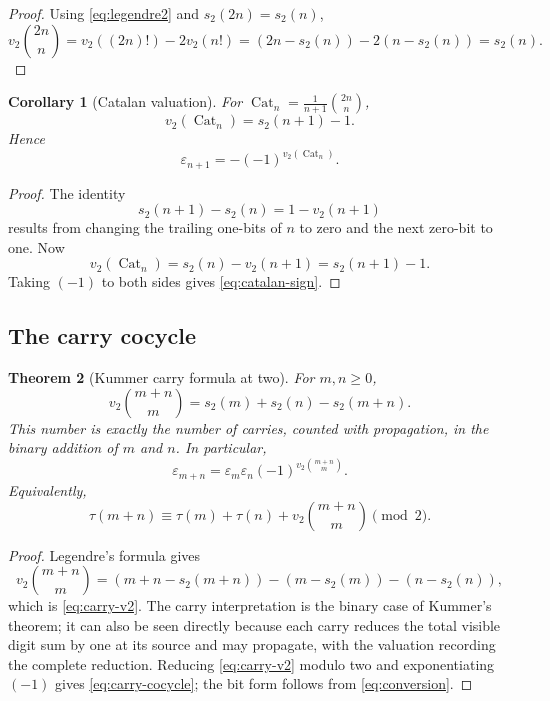 \documentclass[11pt,oneside]{article}
\newtheorem{theorem}{Theorem}[section]
\newtheorem{corollary}[theorem]{Corollary}
\theoremstyle{definition}
\theoremstyle{remark}
\newcommand{\swt}{s_2}
\newcommand{\vtwo}{v_2}
\newcommand{\eps}{\varepsilon}
\newcommand{\Cat}{\operatorname{Cat}}
\newcommand{\1}{\mathbf 1}
\begin{document}
\begin{proof}
Using \eqref{eq:legendre2} and \(\swt(2n)=\swt(n)\),
\[
 \vtwo\binom{2n}{n}
 =\vtwo((2n)!)-2\vtwo(n!)
 =(2n-\swt(n))-2(n-\swt(n))
 =\swt(n).
\]
\end{proof}

\begin{corollary}[Catalan valuation]
\label{cor:catalan}
For \(\Cat_n=\frac1{n+1}\binom{2n}{n}\),
\begin{equation}
 \vtwo(\Cat_n)=\swt(n+1)-1.
 \label{eq:catalan-v2}
\end{equation}
Hence
\begin{equation}
 \boxed{\eps_{n+1}=-(-1)^{\vtwo(\Cat_n)}}.
 \label{eq:catalan-sign}
\end{equation}
\end{corollary}

\begin{proof}
The identity
\begin{equation}
 \swt(n+1)-\swt(n)=1-\vtwo(n+1)
 \label{eq:successor-weight}
\end{equation}
results from changing the trailing one-bits of \(n\) to zero and the next zero-bit to one.
Now
\[
 \vtwo(\Cat_n)=\swt(n)-\vtwo(n+1)=\swt(n+1)-1.
\]
Taking \((-1)\) to both sides gives \eqref{eq:catalan-sign}.
\end{proof}

\subsection{The carry cocycle}

\begin{theorem}[Kummer carry formula at two]
\label{thm:carry}
For \(m,n\ge0\),
\begin{equation}
 \vtwo\binom{m+n}{m}
 =\swt(m)+\swt(n)-\swt(m+n).
 \label{eq:carry-v2}
\end{equation}
This number is exactly the number of carries, counted with propagation, in the binary addition
of \(m\) and \(n\).  In particular,
\begin{equation}
 \boxed{
 \eps_{m+n}=\eps_m\eps_n(-1)^{\vtwo\binom{m+n}{m}}.}
 \label{eq:carry-cocycle}
\end{equation}
Equivalently,
\begin{equation}
 \tau(m+n)\equiv
 \tau(m)+\tau(n)+\vtwo\binom{m+n}{m}\pmod2.
 \label{eq:carry-bit}
\end{equation}
\end{theorem}

\begin{proof}
Legendre's formula gives
\[
 \vtwo\binom{m+n}{m}
 =(m+n-\swt(m+n))-(m-\swt(m))-(n-\swt(n)),
\]
which is \eqref{eq:carry-v2}.  The carry interpretation is the binary case of Kummer's
theorem; it can also be seen directly because each carry reduces the total visible digit sum
by one at its source and may propagate, with the valuation recording the complete reduction.
Reducing \eqref{eq:carry-v2} modulo two and exponentiating \((-1)\) gives
\eqref{eq:carry-cocycle}; the bit form follows from \eqref{eq:conversion}.
\end{proof}
\end{document}
